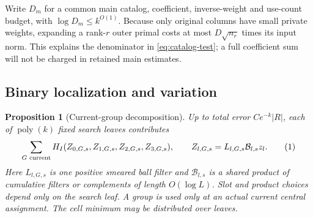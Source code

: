 \documentclass[11pt]{article}
\newtheorem{proposition}[theorem]{Proposition}
\theoremstyle{definition}
\newcommand{\poly}{\operatorname{poly}}
\newcommand{\eqtag}[1]{\refstepcounter{equation}\tag{\theequation}\label{#1}}
\numberwithin{equation}{section}
\begin{document}
Write $D_m$ for a common main catalog, coefficient, inverse-weight and use-count budget, with $\log D_m\le k^{O(1)}$. Because only original columns have small private weights, expanding a rank-$r$ outer primal costs at most $D\sqrt{n_r}$ times its input norm. This explains the denominator in \eqref{eq:catalog-test}; a full coefficient sum will not be charged in retained main estimates.

\subsection{Binary localization and variation}
\begin{proposition}[Current-group decomposition]\label{prop:localize}
Up to total error $Ce^{-k}|R|$, each of $\poly(k)$ fixed search leaves contributes
\[
 \sum_{G\text{ current}}H_I(Z_{0,G,s},Z_{1,G,s},Z_{2,G,s},Z_{3,G,s}),
 \qquad Z_{l,G,s}=L_{l,G,s}\mathcal B_{l,s}z_l.
 \eqtag{eq:localized}
\]
Here $L_{l,G,s}$ is one positive smeared ball filter and $\mathcal B_{l,s}$ is a shared product of cumulative filters or complements of length $O(\log L)$. Slot and product choices depend only on the search leaf. A group is used only at an actual current central assignment. The cell minimum may be distributed over leaves.
\end{proposition}
\end{document}
